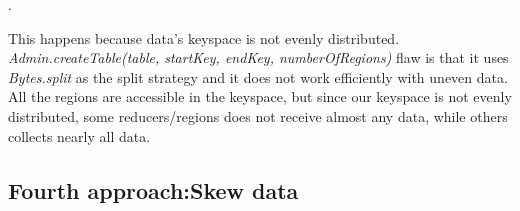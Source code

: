 \bigskip 

 . 

\bigskip

This happens because data's keyspace is not evenly distributed. \textit{Admin.createTable(table, startKey, endKey, numberOfRegions)} flaw is that it uses \textit{Bytes.split} as the split strategy and it does not work efficiently with uneven data. All the regions are accessible in the keyspace, but since our keyspace is not evenly distributed, some reducers/regions does not receive almost any data, while others collects nearly all data.



\subsection{Fourth approach:Skew data}

